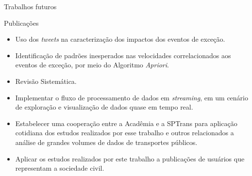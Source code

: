 \documentclass{beamer}
\begin{document}
\begin{frame}{Trabalhos futuros}

\begin{block}{Publicações}
\begin{itemize}
\item Uso dos \textit{tweets} na caracterização dos impactos dos eventos de exceção.
\item Identificação de padrões inesperados nas velocidades correlacionados aos eventos de exceção, por meio do Algoritmo \textit{Apriori}.
\item Revisão Sistemática.
\end{itemize}
\end{block}

\begin{itemize}
\item Implementar o fluxo de processamento de dados em \textit{streaming}, em um cenário de exploração e visualização de dados quase em tempo real.
\item Estabelecer uma cooperação entre a Acadêmia e a SPTrans para aplicação cotidiana dos estudos realizados por esse trabalho e outros relacionados a análise de grandes volumes de dados de transportes públicos.
\item Aplicar os estudos realizados por este trabalho a publicações de usuários que representam a sociedade civil.
\end{itemize}
\end{frame}
\begin{frame}
\titlepage %
\end{frame}
\end{document}
